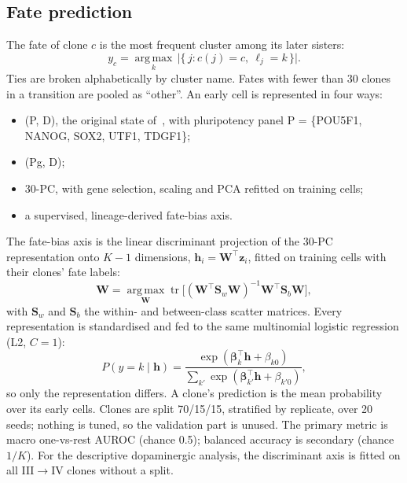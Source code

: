 \documentclass[10pt,journal,compsoc]{IEEEtran}
\begin{document}
\subsection{Fate prediction }\label{sec:m_rq3}
The fate of clone $c$ is the most frequent cluster among its later sisters:
\begin{equation}
y_c=\operatorname*{arg\,max}_{k}\,\bigl|\{\,j: c(j)=c,\ \ell_j=k\,\}\bigr| .
\end{equation}
Ties are broken alphabetically by cluster name. Fates with fewer than 30 clones in a
transition are pooled as ``other''. An early cell is represented in four ways:
\begin{itemize}
\item (P, D), the original state of~\cite{Kanu_ICUFN2026,Kanu_TCBB}, with pluripotency panel
P = \{POU5F1, NANOG, SOX2, UTF1, TDGF1\};
\item (Pg, D);
\item 30-PC, with gene selection, scaling and PCA refitted on training cells;
\item a supervised, lineage-derived fate-bias axis.
\end{itemize}
The fate-bias axis is the linear discriminant projection of the 30-PC representation onto
$K{-}1$ dimensions, $\mathbf{h}_i=\mathbf{W}^{\top}\mathbf{z}_i$, fitted on training
cells with their clones' fate labels:
\begin{equation}
\mathbf{W}=\operatorname*{arg\,max}_{\mathbf{W}}\operatorname{tr}\!\bigl[(\mathbf{W}^{\top}\mathbf{S}_w\mathbf{W})^{-1}\mathbf{W}^{\top}\mathbf{S}_b\mathbf{W}\bigr],
\end{equation}
with $\mathbf{S}_w$ and $\mathbf{S}_b$ the within- and between-class scatter matrices. Every
representation is standardised and fed to the same multinomial logistic regression (L2,
$C=1$):
\begin{equation}
P(y=k\mid\mathbf{h})=\frac{\exp(\boldsymbol{\beta}_k^{\top}\mathbf{h}+\beta_{k0})}{\sum_{k'}\exp(\boldsymbol{\beta}_{k'}^{\top}\mathbf{h}+\beta_{k'0})},
\end{equation}
so only the representation differs. A clone's prediction is the mean probability over its
early cells. Clones are split 70/15/15, stratified by replicate, over 20 seeds; nothing is
tuned, so the validation part is unused. The primary metric is macro one-vs-rest AUROC
(chance 0.5); balanced accuracy is secondary (chance $1/K$). For the descriptive dopaminergic
analysis, the discriminant axis is fitted on all III$\to$IV clones without a split.
\end{document}
